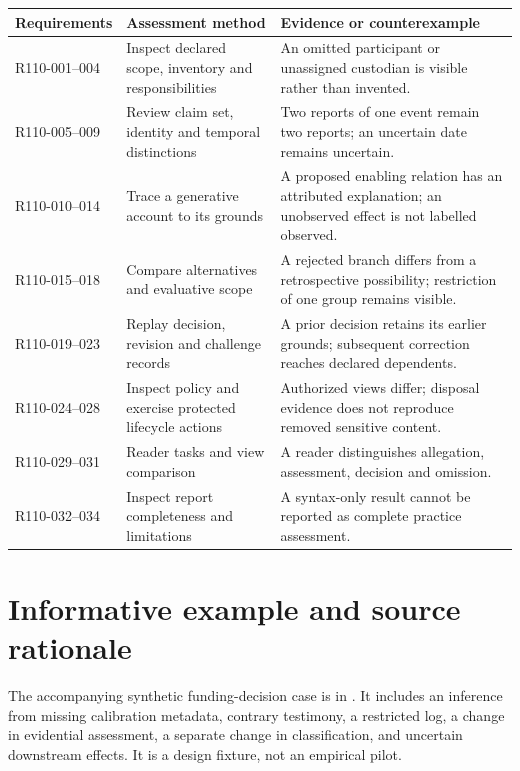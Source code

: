 \documentclass[11pt,a4paper]{article}
\begin{document}
\begin{longtable}{L{0.24\textwidth}L{0.31\textwidth}L{0.37\textwidth}}
\toprule
Requirements & Assessment method & Evidence or counterexample\\
\midrule
\endhead
R110-001--004 & Inspect declared scope, inventory and responsibilities & An omitted participant or unassigned custodian is visible rather than invented.\\
R110-005--009 & Review claim set, identity and temporal distinctions & Two reports of one event remain two reports; an uncertain date remains uncertain.\\
R110-010--014 & Trace a generative account to its grounds & A proposed enabling relation has an attributed explanation; an unobserved effect is not labelled observed.\\
R110-015--018 & Compare alternatives and evaluative scope & A rejected branch differs from a retrospective possibility; restriction of one group remains visible.\\
R110-019--023 & Replay decision, revision and challenge records & A prior decision retains its earlier grounds; subsequent correction reaches declared dependents.\\
R110-024--028 & Inspect policy and exercise protected lifecycle actions & Authorized views differ; disposal evidence does not reproduce removed sensitive content.\\
R110-029--031 & Reader tasks and view comparison & A reader distinguishes allegation, assessment, decision and omission.\\
R110-032--034 & Inspect report completeness and limitations & A syntax-only result cannot be reported as complete practice assessment.\\
\bottomrule
\end{longtable}

\section{Informative example and source rationale}
The accompanying synthetic funding-decision case is in . It includes an inference from missing calibration metadata, contrary testimony, a restricted log, a change in evidential assessment, a separate change in classification, and uncertain downstream effects. It is a design fixture, not an empirical pilot.
\end{document}
